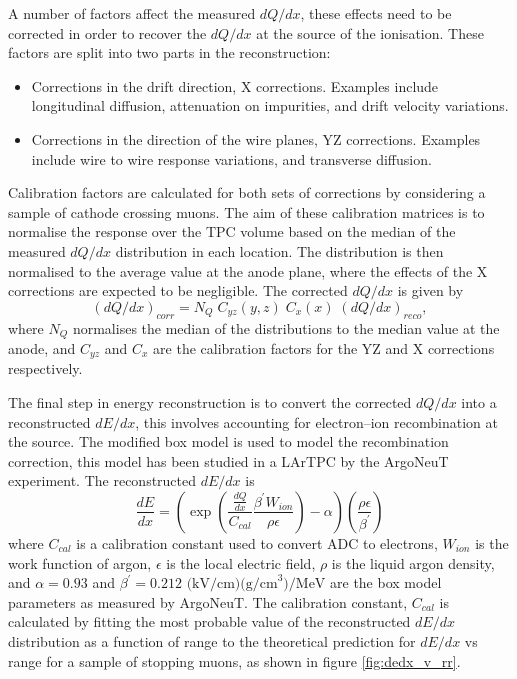 A number of factors affect the measured $dQ/dx$, these effects need to be 
corrected in order to recover the $dQ/dx$ at the source of the ionisation. 
These factors are split into two parts in the \protodune{} reconstruction:
\begin{itemize}
	\item Corrections in the drift direction, X corrections. Examples include 
		longitudinal diffusion, attenuation on impurities, and drift velocity
		variations.
	\item Corrections in the direction of the wire planes, YZ corrections.
		Examples include wire to wire response variations, and transverse diffusion.
\end{itemize}
Calibration factors are calculated for both sets of corrections by considering a
sample of cathode crossing muons. The aim of these calibration matrices is to 
normalise the response over the TPC volume based on the median of the measured
$dQ/dx$ distribution in each location. The distribution is then normalised to 
the average value at the anode plane, where the effects of the X corrections are
expected to be negligible. The corrected $dQ/dx$ is given by
\begin{equation}
	\left( dQ/dx \right)_{corr} = N_Q \; C_{yz}(y, z) \; C_x(x) \; \left( dQ/dx
	\right)_{reco},
\end{equation}
where $N_Q$ normalises the median of the distributions to the median value at
the anode, and $C_{yz}$ and $C_{x}$ are the calibration factors for the YZ and 
X corrections respectively.

The final step in energy reconstruction is to convert the corrected $dQ/dx$ into
a reconstructed $dE/dx$, this involves accounting for electron--ion
recombination at the source. The modified box model is used to model the
recombination correction, this model has been studied in a LArTPC by the 
ArgoNeuT experiment\cite{Acciarri2013a}. The reconstructed $dE/dx$ is 
\begin{equation}
	\frac{dE}{dx} = \left( \exp \left( \frac{\frac{dQ}{dx}}{C_{cal}} \frac{\beta^\prime
	W_{ion}}{\rho \epsilon} \right) - \alpha \right)
	\left( \frac{\rho \epsilon}{\beta^\prime} \right)
\end{equation}
where $C_{cal}$ is a calibration constant used to convert ADC to electrons,
$W_{ion}$ is the work function of argon, $\epsilon$ is the local electric field,
$\rho$ is the liquid argon density, and \(\alpha = 0.93\) and 
\(\beta^\prime = 0.212 \mbox{ (kV/cm)(g/cm}^3) / \mbox{MeV}\) are the box model 
parameters as measured by ArgoNeuT. The calibration constant, $C_{cal}$ is 
calculated by fitting the most probable value of the reconstructed $dE/dx$ 
distribution as a function of range to the theoretical prediction for $dE/dx$ 
vs range for a sample of stopping muons, as shown in figure \ref{fig:dedx_v_rr}.


